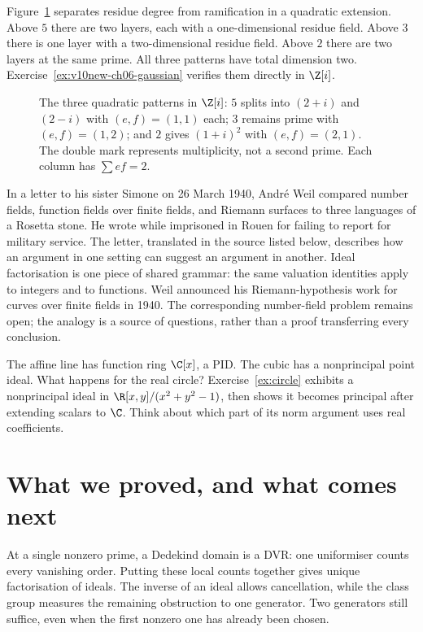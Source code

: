Figure~\ref{fig:v10new-ch06-splitting} separates residue degree from ramification in a quadratic extension. Above $5$ there are two layers, each with a one-dimensional residue field. Above $3$ there is one layer with a two-dimensional residue field. Above $2$ there are two layers at the same prime. All three patterns have total dimension two. Exercise~\ref{ex:v10new-ch06-gaussian} verifies them directly in $\Z[i]$.

\begin{figure}[ht]
\centering
{}
\caption{The three quadratic patterns in $\Z[i]$: $5$ splits into $(2+i)$ and $(2-i)$ with $(e,f)=(1,1)$ each; $3$ remains prime with $(e,f)=(1,2)$; and $2$ gives $(1+i)^2$ with $(e,f)=(2,1)$. The double mark represents multiplicity, not a second prime. Each column has $\sum ef=2$.}
\label{fig:v10new-ch06-splitting}
\end{figure}

\begin{beauty}
In a letter to his sister Simone on 26 March 1940, André Weil compared number fields, function fields over finite fields, and Riemann surfaces to three languages of a Rosetta stone. He wrote while imprisoned in Rouen for failing to report for military service. The letter, translated in the source listed below, describes how an argument in one setting can suggest an argument in another. Ideal factorisation is one piece of shared grammar: the same valuation identities apply to integers and to functions. Weil announced his Riemann-hypothesis work for curves over finite fields in 1940. The corresponding number-field problem remains open; the analogy is a source of questions, rather than a proof transferring every conclusion.
\end{beauty}

\begin{think}
The affine line has function ring $\C[x]$, a PID. The cubic has a nonprincipal point ideal. What happens for the real circle? Exercise~\ref{ex:circle} exhibits a nonprincipal ideal in $\R[x,y]/(x^2+y^2-1)$, then shows it becomes principal after extending scalars to $\C$. Think about which part of its norm argument uses real coefficients.
\end{think}

\section{What we proved, and what comes next}

At a single nonzero prime, a Dedekind domain is a DVR: one uniformiser counts every vanishing order. Putting these local counts together gives unique factorisation of ideals. The inverse of an ideal allows cancellation, while the class group measures the remaining obstruction to one generator. Two generators still suffice, even when the first nonzero one has already been chosen.

